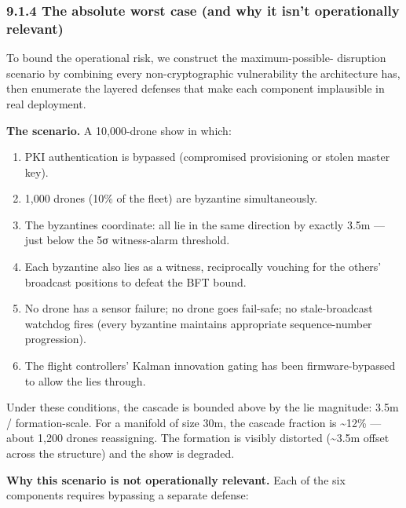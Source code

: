 \subsubsection{9.1.4 The absolute worst case (and why it isn't
operationally
relevant)}\label{the-absolute-worst-case-and-why-it-isnt-operationally-relevant}

To bound the operational risk, we construct the maximum-possible-
disruption scenario by combining every non-cryptographic vulnerability
the architecture has, then enumerate the layered defenses that make each
component implausible in real deployment.

\textbf{The scenario.} A 10,000-drone show in which:

\begin{enumerate}
\def\labelenumi{\arabic{enumi}.}
\tightlist
\item
  PKI authentication is bypassed (compromised provisioning or stolen
  master key).
\item
  1,000 drones (10\% of the fleet) are byzantine simultaneously.
\item
  The byzantines coordinate: all lie in the same direction by exactly
  3.5m --- just below the 5σ witness-alarm threshold.
\item
  Each byzantine also lies as a witness, reciprocally vouching for the
  others' broadcast positions to defeat the BFT bound.
\item
  No drone has a sensor failure; no drone goes fail-safe; no
  stale-broadcast watchdog fires (every byzantine maintains appropriate
  sequence-number progression).
\item
  The flight controllers' Kalman innovation gating has been
  firmware-bypassed to allow the lies through.
\end{enumerate}

Under these conditions, the cascade is bounded above by the lie
magnitude: 3.5m / formation-scale. For a manifold of size 30m, the
cascade fraction is \textasciitilde12\% --- about 1,200 drones
reassigning. The formation is visibly distorted (\textasciitilde3.5m
offset across the structure) and the show is degraded.

\textbf{Why this scenario is not operationally relevant.} Each of the
six components requires bypassing a separate defense:

